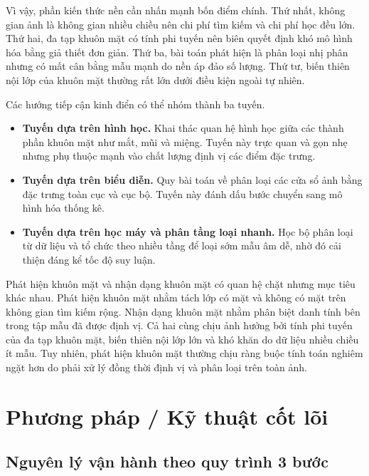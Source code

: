 Vì vậy, phần kiến thức nền cần nhấn mạnh bốn điểm chính.
Thứ nhất, không gian ảnh là không gian nhiều chiều nên chi phí tìm kiếm và chi phí học đều lớn.
Thứ hai, đa tạp khuôn mặt có tính phi tuyến nên biên quyết định khó mô hình hóa bằng giả thiết đơn giản.
Thứ ba, bài toán phát hiện là phân loại nhị phân nhưng có mất cân bằng mẫu mạnh do nền áp đảo số lượng.
Thứ tư, biến thiên nội lớp của khuôn mặt thường rất lớn dưới điều kiện ngoài tự nhiên.

Các hướng tiếp cận kinh điển có thể nhóm thành ba tuyến.
\begin{itemize}
  \item \textbf{Tuyến dựa trên hình học.} Khai thác quan hệ hình học giữa các thành phần khuôn mặt như mắt, mũi và miệng. Tuyến này trực quan và gọn nhẹ nhưng phụ thuộc mạnh vào chất lượng định vị các điểm đặc trưng.
  \item \textbf{Tuyến dựa trên biểu diễn.} Quy bài toán về phân loại các cửa sổ ảnh bằng đặc trưng toàn cục và cục bộ. Tuyến này đánh dấu bước chuyển sang mô hình hóa thống kê.
  \item \textbf{Tuyến dựa trên học máy và phân tầng loại nhanh.} Học bộ phân loại từ dữ liệu và tổ chức theo nhiều tầng để loại sớm mẫu âm dễ, nhờ đó cải thiện đáng kể tốc độ suy luận.
\end{itemize}

Phát hiện khuôn mặt và nhận dạng khuôn mặt có quan hệ chặt nhưng mục tiêu khác nhau.
Phát hiện khuôn mặt nhằm tách lớp có mặt và không có mặt trên không gian tìm kiếm rộng.
Nhận dạng khuôn mặt nhằm phân biệt danh tính bên trong tập mẫu đã được định vị.
Cả hai cùng chịu ảnh hưởng bởi tính phi tuyến của đa tạp khuôn mặt, biến thiên nội lớp lớn và khó khăn do dữ liệu nhiều chiều ít mẫu.
Tuy nhiên, phát hiện khuôn mặt thường chịu ràng buộc tính toán nghiêm ngặt hơn do phải xử lý đồng thời định vị và phân loại trên toàn ảnh.  \cite{li2012facechapter}

\section{Phương pháp / Kỹ thuật cốt lõi}

\subsection{Nguyên lý vận hành theo quy trình 3 bước}

